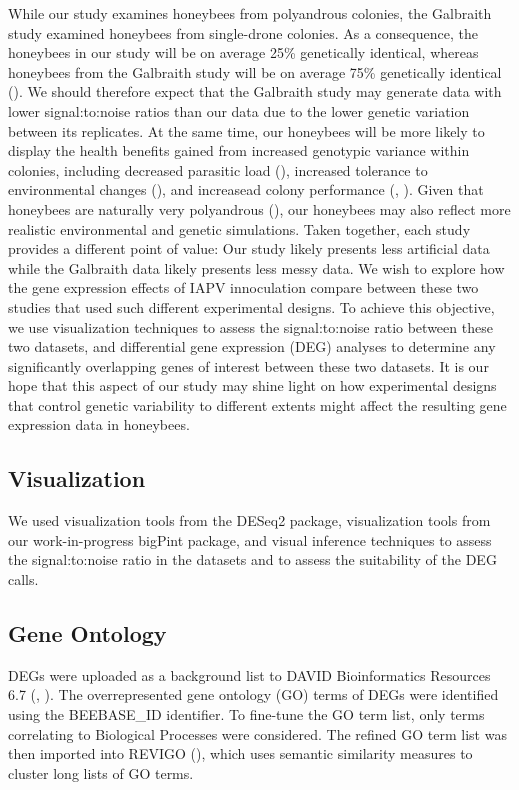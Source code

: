 \documentclass[11pt,a4paper,oldfontcommands,openany]{memoir}
\numberwithin{equation}{section} %
\begin{document}
While our study examines honeybees from polyandrous colonies, the Galbraith study examined honeybees from single-drone colonies. As a consequence, the honeybees in our study will be on average 25\% genetically identical, whereas honeybees from the Galbraith study will be on average 75\% genetically identical (\citealt{sisters}). We should therefore expect that the Galbraith study may generate data with lower signal:to:noise ratios than our data due to the lower genetic variation between its replicates. At the same time, our honeybees will be more likely to display the health benefits gained from increased genotypic variance within colonies, including decreased parasitic load (\citealt{multParasite}), increased tolerance to environmental changes (\citealt{divHyp2}), and increasead colony performance (\citealt{geneticDiverse}, \citealt{geneticDiverse2}). Given that honeybees are naturally very polyandrous (\citealt{patriline}), our honeybees may also reflect more realistic environmental and genetic simulations. Taken together, each study provides a different point of value: Our study likely presents less artificial data while the Galbraith data likely presents less messy data. We wish to explore how the gene expression effects of IAPV innoculation compare between these two studies that used such different experimental designs. To achieve this objective, we use visualization techniques to assess the signal:to:noise ratio between these two datasets, and differential gene expression (DEG) analyses to determine any significantly overlapping genes of interest between these two datasets. It is our hope that this aspect of our study may shine light on how experimental designs that control genetic variability to different extents might affect the resulting gene expression data in honeybees.

\subsection{Visualization}

We used visualization tools from the DESeq2 package, visualization tools from our work-in-progress bigPint package, and visual inference techniques to assess the signal:to:noise ratio in the datasets and to assess the suitability of the DEG calls. 

\subsection{Gene Ontology}

DEGs were uploaded as a background list to DAVID Bioinformatics Resources 6.7 (\citealt{davidBio}, \citealt{davidBio2}). The overrepresented gene ontology (GO) terms of DEGs were identified using the BEEBASE\_ID identifier. To fine-tune the GO term list, only terms correlating to Biological Processes were considered. The refined GO term list was then imported into REVIGO (\citealt{revigo}), which uses semantic similarity measures to cluster long lists of GO terms.
\end{document}
